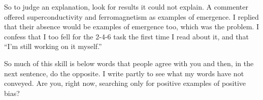 So to judge an explanation, look for results it could not explain. A commenter offered superconductivity and ferromagnetism as examples of emergence. I replied that their absence would be examples of emergence too, which was the problem. I confess that I too fell for the 2-4-6 task the first time I read about it, and that ``I'm still working on it myself.''

So much of this skill is below words that people agree with you and then, in the next sentence, do the opposite. I write partly to see what my words have not conveyed. Are you, right now, searching only for positive examples of positive bias?
